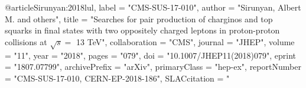 @article{Sirunyan:2018lul,
      label          = "CMS-SUS-17-010",
      author         = "Sirunyan, Albert M. and others",
      title          = "{Searches for pair production of charginos and top
                        squarks in final states with two oppositely charged
                        leptons in proton-proton collisions at $\sqrt{s}=$ 13
                        TeV}",
      collaboration  = "CMS",
      journal        = "JHEP",
      volume         = "11",
      year           = "2018",
      pages          = "079",
      doi            = "10.1007/JHEP11(2018)079",
      eprint         = "1807.07799",
      archivePrefix  = "arXiv",
      primaryClass   = "hep-ex",
      reportNumber   = "CMS-SUS-17-010, CERN-EP-2018-186",
      SLACcitation   = "%
}

